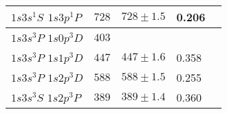 \documentclass[10pt, twocolumn]{article}
\theoremstyle{definition}
\begin{document}
\begin{table}[h]
\begin{tabular}{p{}p{}p{}p{}p{}}
    \hline
    $1s3s{}^1\!S$ $1s3p{}^1\!P$ & $728$                                              & $728\pm1.5$                                       & 0.206   &                 \\
    \hline
    $1s3s{}^3\!P$ $1s0p{}^3\!D$ & $403$                                              &                                                   &         &                 \\
    \hline
    $1s3s{}^3\!P$ $1s1p{}^3\!D$ & $447$                                              & $447\pm1.6$                                       & 0.358   &                 \\
    \hline
    $1s3s{}^3\!P$ $1s2p{}^3\!D$ & $588$                                              & $588\pm1.5$                                       & 0.255   &                 \\
    \hline
    $1s3s{}^3\!S$ $1s2p{}^3\!P$ & $389$                                              & $389\pm1.4$                                       & 0.360   &                 \\
    \bottomrule
  \end{tabular}
  \label{he-res-table}
\end{table}
\end{document}
